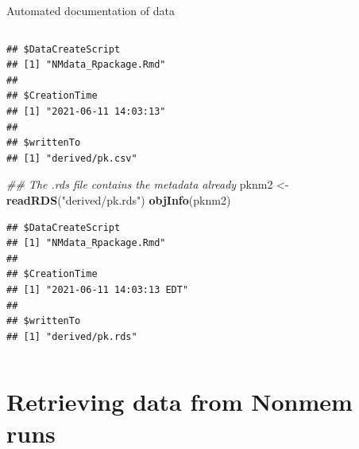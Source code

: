 \documentclass[
  8pt,
  ignorenonframetext,
  aspectratio=169]{beamer}
\newenvironment{Shaded}{\begin{snugshade}}{\end{snugshade}}
\newcommand{\CommentTok}[1]{\textcolor[rgb]{0.56,0.35,0.01}{\textit{#1}}}
\newcommand{\KeywordTok}[1]{\textcolor[rgb]{0.13,0.29,0.53}{\textbf{#1}}}
\newcommand{\NormalTok}[1]{#1}
\newcommand{\StringTok}[1]{\textcolor[rgb]{0.31,0.60,0.02}{#1}}
\begin{document}
\begin{frame}[fragile]{Automated documentation of data}
\begin{columns}[T]
\begin{column}{0.48\textwidth}
\begin{verbatim}
## $DataCreateScript
## [1] "NMdata_Rpackage.Rmd"
## 
## $CreationTime
## [1] "2021-06-11 14:03:13"
## 
## $writtenTo
## [1] "derived/pk.csv"
\end{verbatim}

\begin{Shaded}
\begin{Highlighting}[]
\CommentTok{\#\# The .rds file contains the metadata already}
\NormalTok{pknm2 \textless{}{-}}\StringTok{ }\KeywordTok{readRDS}\NormalTok{(}\StringTok{"derived/pk.rds"}\NormalTok{)}
\KeywordTok{objInfo}\NormalTok{(pknm2)}
\end{Highlighting}
\end{Shaded}

\begin{verbatim}
## $DataCreateScript
## [1] "NMdata_Rpackage.Rmd"
## 
## $CreationTime
## [1] "2021-06-11 14:03:13 EDT"
## 
## $writtenTo
## [1] "derived/pk.rds"
\end{verbatim}
\end{column}
\end{columns}

\normalsize
\end{frame}

\hypertarget{retrieving-data-from-nonmem-runs}{%
\section{Retrieving data from Nonmem
runs}\label{retrieving-data-from-nonmem-runs}}
\end{document}
